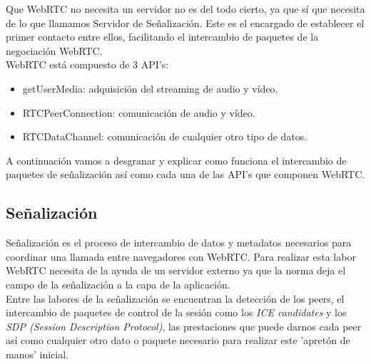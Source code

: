 Que WebRTC no necesita un servidor no es del todo cierto, ya que sí que necesita de lo que llamamos Servidor de Señalización. Este es el encargado de establecer el primer contacto entre ellos, facilitando el intercambio de paquetes de la negociación WebRTC.\\

\noindent WebRTC está compuesto de 3 API's:

\begin{itemize}
\item getUserMedia: adquisición del streaming de audio y vídeo.
\item RTCPeerConnection: comunicación de audio y vídeo.
\item RTCDataChannel: comunicación de cualquier otro tipo de datos.
\end{itemize}

A continuación vamos a desgranar y explicar como funciona el intercambio de paquetes de señalización así como cada una de las API's que componen WebRTC.\\

\begin{center}
\end{center}


\subsection{Señalización} 
\label{subsec:senalizacion}

Señalización es el proceso de intercambio de datos y metadatos necesarios para coordinar una llamada entre navegadores con WebRTC. Para realizar esta labor WebRTC necesita de la ayuda de un servidor externo ya que la norma deja el campo de la señalización a la capa de la aplicación.\\

Entre las labores de la señalización se encuentran la detección de los peers, el intercambio de paquetes de control de la sesión como los \textit{ICE candidates} y los \textit{SDP (Session Description Protocol)}, las prestaciones que puede darnos cada peer así como cualquier otro dato o paquete necesario para realizar este 'apretón de manos' inicial.\\

